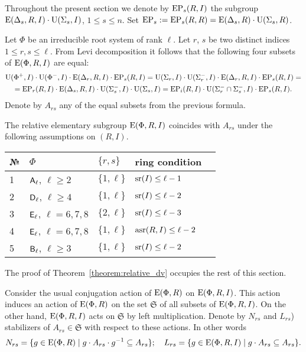 Throughout the present section we denote by $\operatorname{EP}_s(R, I)$ the subgroup $\operatorname{E}(\Delta_s, R, I) \cdot \operatorname{U}(\Sigma_s, I)$, $1 \leq s \leq n$.
Set $\operatorname{EP}_s := \operatorname{EP}_s(R, R) = \operatorname{E}(\Delta_s, R) \cdot \operatorname{U}(\Sigma_s, R)$. 

Let $\Phi$ be an irreducible root system of rank $\ell$.
Let $r$, $s$ be two distinct indices $1\leq r,s \leq \ell$.
From Levi decomposition it follows that the following four subsets of $\operatorname{E}(\Phi, R, I)$ are equal:
\begin{multline}\nonumber \operatorname{U}(\Phi^+, I)\cdot \operatorname{U}(\Phi^-, I) \cdot \operatorname{E}(\Delta_r, R, I) \cdot \operatorname{EP}_s(R, I) = 
\operatorname{U}(\Sigma_r, I)\cdot \operatorname{U}(\Sigma^-_r, I) \cdot \operatorname{E}(\Delta_r, R, I) \cdot \operatorname{EP}_s(R, I) = \\
= \operatorname{EP}_r(R, I) \cdot \operatorname{E}(\Delta_s, R, I) \cdot \operatorname{U}(\Sigma_s^-, I)\cdot \operatorname{U}(\Sigma_s, I) = 
\operatorname{EP}_i(R, I) \cdot \operatorname{U}(\Sigma^-_r\cap \Sigma^-_s, I) \cdot \operatorname{EP}_s(R, I). \end{multline}
Denote by $A_{rs}$ any of the equal subsets from the previous formula. 

\begin{thm}\label{theorem:relative_dv}
The relative elementary subgroup $\operatorname{E}(\Phi, R, I)$ coincides with $A_{rs}$ under the following assumptions on $(R, I)$.
  \begin{center}
    \begin{tabular}{| l | l | l | l | l |} \hline
    № & $\Phi$ & $\{r,s\}$ & ring condition \\ \hline
    1 & $\mathsf{A}_\ell$, $\ell\geq 2$ & $\{1, \ell\}$ & $\operatorname{sr}(I) \leq \ell-1$ \\ \hline
    2 & $\mathsf{D}_\ell$, $\ell\geq 4$ & $\{1, \ell\}$ & $\operatorname{sr}(I) \leq \ell-2$ \\ \hline    
    3 & $\mathsf{E}_\ell$, $\ell=6,7,8$ & $\{2, \ell\}$ & $\operatorname{sr}(I) \leq \ell-3$ \\ \hline     
    4 & $\mathsf{E}_\ell$, $\ell=6,7,8$ & $\{1, \ell\}$ & $\operatorname{asr}(R, I)\leq \ell-2$ \\ \hline    
    5 & $\mathsf{B}_\ell$, $\ell\geq 3$ & $\{1, \ell\}$ & $\operatorname{sr}(I) \leq \ell-2$ \\ \hline
    \end{tabular} \end{center} 
\end{thm}
The proof of Theorem~\ref{theorem:relative_dv} occupies the rest of this section.

Consider the usual conjugation action of $\operatorname{E}(\Phi, R)$ on $\operatorname{E}(\Phi, R, I)$. 
This action induces an action of $\operatorname{E}(\Phi, R)$ on the set $\mathfrak{S}$ of all subsets of $\operatorname{E}(\Phi, R, I)$.
On the other hand, $\operatorname{E}(\Phi, R, I)$ acts on $\mathfrak{S}$ by left multiplication.
Denote by $N_{rs}$ and $L_{rs}$) stabilizers of $A_{rs} \in \mathfrak{S}$ with respect to these actions.
In other words $$N_{rs} = \{ g\in \operatorname{E}(\Phi, R) \mid g \cdot A_{rs} \cdot g^{-1} \subseteq A_{rs} \};\quad L_{rs}= \{ g\in \operatorname{E}(\Phi, R, I) \mid g \cdot A_{rs} \subseteq A_{rs} \}.$$

